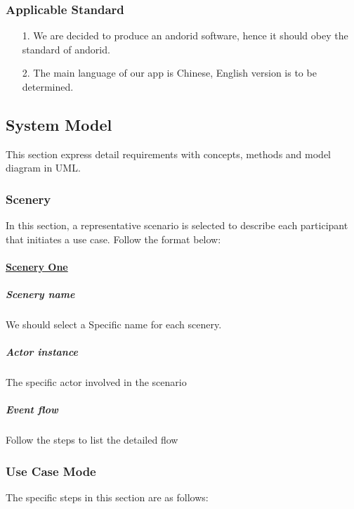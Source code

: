 \documentclass[10pt]{article}
\begin{document}
\subsubsection{Applicable Standard}
\begin{itemize}
	\item[1.] We are decided to produce an andorid software, hence it should obey the standard of andorid.
	\item[2.] The main language of our app is Chinese, English version is to be determined.
	
\end{itemize}

\subsection{System Model}
This section express detail requirements with concepts, methods and model diagram in UML.

\subsubsection{Scenery}
In this section, a representative scenario is selected to describe each participant that initiates a use case. Follow the format below:

\paragraph{\underline{Scenery One}}
\subparagraph{Scenery name} We should select a Specific name for each scenery.
\subparagraph{Actor instance} The specific actor involved in the scenario
\subparagraph{Event flow} Follow the steps to list the detailed flow

\subsubsection{Use Case Mode}
The specific steps in this section are as follows:
\end{document}
